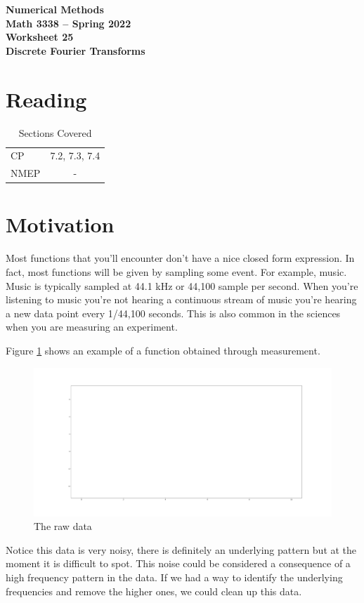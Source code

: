 \documentclass[11pt,letterpaper]{article}
\newcommand{\semester}{Spring 2022}
\begin{document}
\begin{center}
{\huge{\bf  Numerical Methods}} \\[1.5ex]
{\bf Math 3338 -- \semester}\\[1.5ex]
{\Large{\bf Worksheet 25\ \\[2ex] Discrete Fourier Transforms}}\\
\end{center}
\vspace{2mm}


\section{Reading}

\begin{table}[!ht]
 \centering
 \begin{tabular}{lc}
   CP &  7.2, 7.3, 7.4 \\
 NMEP &  -
 \end{tabular}
\caption{Sections Covered}
\end{table}

\section{Motivation}

Most functions that you'll encounter don't have a nice closed form expression. In fact, most functions
will be given by sampling some event. For example, music. Music is typically sampled at 44.1 kHz or
44,100 sample per second. When you're listening to music you're not hearing a continuous stream of 
music you're hearing a new data point every 1/44,100 seconds. This is also common in the sciences
when you are measuring an experiment. 

Figure \ref{fig:raw_data} shows an example of a function obtained through measurement. 
\begin{figure}[!ht]
 \centering
 \includegraphics[width=.6\textwidth]{images/raw_data.pdf}
 \caption{The raw data}
 \label{fig:raw_data}
\end{figure}
Notice this data is very noisy, there is definitely an underlying pattern but at the moment it is
difficult to spot. This noise could be considered a consequence of a high frequency pattern in the
data. If we had a way to identify the underlying frequencies and remove the higher ones, we could
clean up this data.
\end{document}
